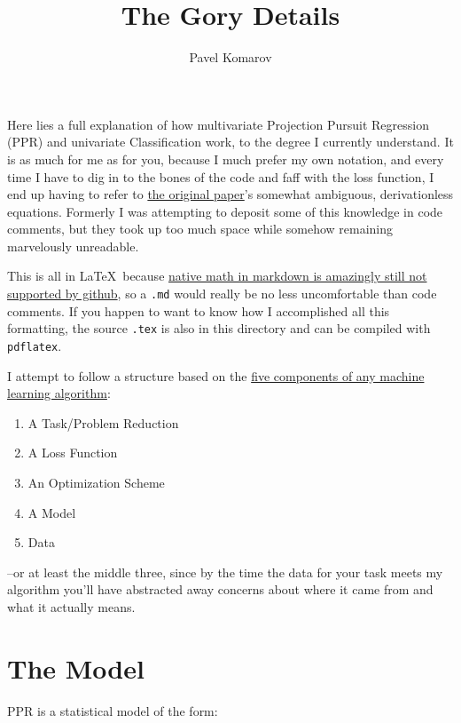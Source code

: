 \documentclass[12pt]{article}
\begin{document}
\title{The Gory Details}
\author{Pavel Komarov}
\maketitle

Here lies a full explanation of how multivariate Projection Pursuit Regression (PPR) and univariate Classification work, to the degree I currently understand. It is as much for me as for you, because I much prefer my own notation, and every time I have to dig in to the bones of the code and faff with the loss function, I end up having to refer to \href{http://www.slac.stanford.edu/cgi-wrap/getdoc/slac-pub-3824.pdf}{the original paper}'s somewhat ambiguous, derivationless equations. Formerly I was attempting to deposit some of this knowledge in code comments, but they took up too much space while somehow remaining marvelously unreadable.

This is all in \LaTeX\ because \href{https://github.com/github/markup/issues/897}{native math in markdown is amazingly still not supported by github}, so a \texttt{.md} would really be no less uncomfortable than code comments. If you happen to want to know how I accomplished all this formatting, the source \texttt{.tex} is also in this directory and can be compiled with \texttt{pdflatex}.

I attempt to follow a structure based on the \href{http://lmgtfy.com/?q=sorry+this+link+doesn\%27t+work+yet+I+still+have+to+post+those+slides}{five components of any machine learning algorithm}:

\begin{enumerate}
	\setlength\itemsep{-2mm}
	\item A Task/Problem Reduction
	\item A Loss Function
	\item An Optimization Scheme
	\item A Model
	\item Data
\end{enumerate}

--or at least the middle three, since by the time the data for your task meets my algorithm you'll have abstracted away concerns about where it came from and what it actually means.

\section{The Model}

PPR is a statistical model of the form:
\end{document}
